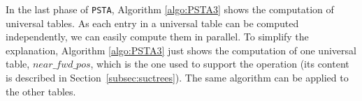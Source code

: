 In the last phase of {\tt PSTA}, Algorithm \ref{algo:PSTA3} shows the
computation of universal tables.  As each entry in a universal table
can be computed independently, we can easily compute them in parallel.
To simplify the explanation, Algorithm \ref{algo:PSTA3} just shows the
computation of one universal table, $near\_fwd\_pos$, which is the one
used to support the {\fwdsearch} operation (its content is described
in Section~\ref{subsec:suctrees}). The same algorithm can be applied
to the other tables.
%
%
%
%
%
%
%

